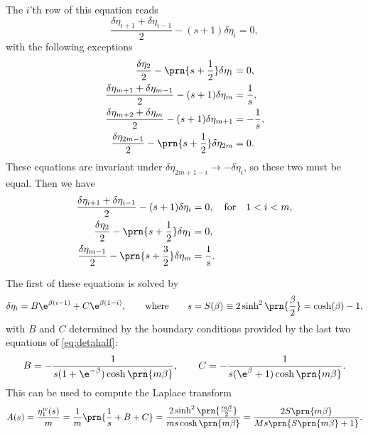 \documentclass[12pt]{article}
\newcommand{\etwm}{\eta^w}
\begin{document}
The $i$'th row of this equation reads
%
\begin{equation}\label{eq:detarow}
  \frac{\delta\eta_{i+1}+\delta\eta_{i-1}}{2} - (s+1)\delta\eta_i = 0,
\end{equation}
%
with the following exceptions
%
\begin{equation}\label{eq:detabnduni}
\begin{aligned}
  \frac{\delta\eta_2}{2} - \prn{s+\frac{1}{2}}\delta\eta_1 &= 0, \\
  \frac{\delta\eta_{m+1}+\delta\eta_{m-1}}{2} - (s+1)\delta\eta_{m} &= \frac{1}{s},\\
  \frac{\delta\eta_{m+2}+\delta\eta_{m}}{2} - (s+1)\delta\eta_{m+1} &= -\frac{1}{s},\\
  \frac{\delta\eta_{2m-1}}{2} - \prn{s+\frac{1}{2}}\delta\eta_{2m} &= 0.
\end{aligned}
\end{equation}
%
These equations are invariant under $\delta\eta_{2m+1-i} \to -\delta\eta_i$, so these two must be equal.
Then we have
%
\begin{equation}\label{eq:detahalf}
\begin{aligned}
  \frac{\delta\eta_{i+1}+\delta\eta_{i-1}}{2} - (s+1)\delta\eta_i &= 0,
  \quad\text{for}\quad 1<i<m, \\
  \frac{\delta\eta_2}{2} - \prn{s+\frac{1}{2}}\delta\eta_1 &= 0, \\
  \frac{\delta\eta_{m-1}}{2} - \prn{s+\frac{3}{2}}\delta\eta_{m} &= \frac{1}{s}.
\end{aligned}
\end{equation}
%

The first of these equations is solved by
%
\begin{equation}\label{eq:detagensol}
  \delta\eta_i = B\e^{\beta(i-1)} + C\e^{\beta(1-i)},
  \qquad\text{where}\qquad
  s = S(\beta) \equiv 2 \sinh^2 \prn{\frac{\beta}{2}}
    = \cosh (\beta) - 1,
\end{equation}
%
with $B$ and $C$ determined by the boundary conditions provided by the last two equations of \eqref{eq:detahalf}:
%
\begin{equation}\label{eq:unicoeffs}
  B = -\frac{1}{s(1 + \e^{-\beta}) \cosh \prn{m \beta}},
  \qquad
  C = -\frac{1}{s(\e^{\beta} + 1) \cosh \prn{m \beta}}.
\end{equation}
%
This can be used to compute the Laplace transform
%
\begin{equation}\label{eq:unilaplace}
  A(s) = \frac{\etwm_1(s)}{m}
   = \frac{1}{m}\prn{\frac{1}{s}+B+C}
   = \frac{2\sinh^2\prn{\frac{m \beta}{2}}}{m s \cosh\prn{m \beta}}
   = \frac{2 S\prn{m \beta}}{M s \prn{S\prn{m \beta} + 1}}.
\end{equation}
%
\end{document}
